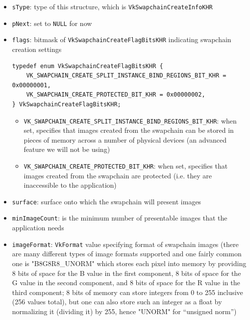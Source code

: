 \documentclass[12pt,letterpaper]{article}
\newcommand{\inquotes}[1]{``#1''}	%
\newcommand{\cil}[1]{\texttt{#1}}
\begin{document}
    \begin{itemize}    
        \item \cil{sType}: type of this structure, which is \cil{VkSwapchainCreateInfoKHR}
        
        \item \cil{pNext}: set to \cil{NULL} for now
        
        \item \cil{flags}: bitmask of \cil{VkSwapchainCreateFlagBitsKHR} indicating swapchain creation settings
            \begin{verbatim}
typedef enum VkSwapchainCreateFlagBitsKHR {
    VK_SWAPCHAIN_CREATE_SPLIT_INSTANCE_BIND_REGIONS_BIT_KHR = 0x00000001,
    VK_SWAPCHAIN_CREATE_PROTECTED_BIT_KHR = 0x00000002,
} VkSwapchainCreateFlagBitsKHR;
            \end{verbatim}
            \begin{itemize}
                \item \cil{VK_SWAPCHAIN_CREATE_SPLIT_INSTANCE_BIND_REGIONS_BIT_KHR}: when set, specifies that images created from the swapchain can be stored in pieces of memory across a number of physical devices (an advanced feature we will not be using)
                
                \item \cil{VK_SWAPCHAIN_CREATE_PROTECTED_BIT_KHR}: when set, specifies that images created from the swapchain are protected (i.e. they are inaccessible to the application)
            \end{itemize}
        
        \item \cil{surface}: surface onto which the swapchain will present images
        
        \item \cil{minImageCount}: is the minimum number of presentable images that the application needs
        
        \item \cil{imageFormat}: \cil{VkFormat} value specifying format of swapchain images (there are many different types of image formats supported and one fairly common one is "B8G8R8\_UNORM" which stores each pixel into memory by providing 8 bits of space for the B value in the first component, 8 bits of space for the G value in the second component, and 8 bits of space for the R value in the third component; 8 bits of memory can store integers from 0 to 255 inclusive (256 values total), but one can also store such an integer as a float by normalizing it (dividing it) by 255, hence "UNORM" for \inquotes{unsigned norm})
        

\end{itemize}
\end{document}
